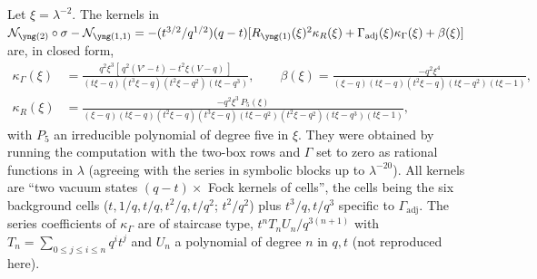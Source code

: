 \begin{result}\label{cr:tower}
Let $\xi = \lambda^{-2}$. The kernels in $\Nfix_{\ytwo}\circ\sigma - \Nfix_{\yoneone} = -(t^{3/2}/q^{1/2})(q-t)[R_{\yone}(\xi)^2\kappa_R(\xi) + \Gamma_{\mathrm{adj}}(\xi)\kappa_\Gamma(\xi) + \beta(\xi)]$ are, in closed form,
\begingroup\small
\begin{align}
\kappa_\Gamma(\xi) &= \frac{q^2\xi^3[\,q^2(V'-t) - t^2\xi(V-q)\,]}{(t\xi-q)(t^3\xi-q)(t^2\xi-q^2)(t\xi-q^3)},\qquad
\beta(\xi) = \frac{-q^2\xi^4}{(\xi-q)(t\xi-q)(t^2\xi-q)(t\xi-q^2)(t\xi-1)},\label{eq:kernels1}\\
\kappa_R(\xi) &= \frac{-q^2\xi^3\,P_5(\xi)}{(\xi-q)(t\xi-q)(t^2\xi-q)(t^3\xi-q)(t\xi-q^2)(t^2\xi-q^2)(t\xi-q^3)(t\xi-1)},\label{eq:kernels2}
\end{align}
\endgroup
with $P_5$ an irreducible polynomial of degree five in $\xi$. They were obtained by running the computation with the two-box rows and $\Gamma$ set to zero as rational functions in $\lambda$ (agreeing with the series in symbolic blocks up to $\lambda^{-20}$). All kernels are ``two vacuum states $(q-t)\times$ Fock kernels of cells'', the cells being the six background cells ($t, 1/q, t/q, t^2/q, t/q^2$; $t^2/q^2$) plus $t^3/q, t/q^3$ specific to $\Gamma_{\mathrm{adj}}$. The series coefficients of $\kappa_\Gamma$ are of staircase type, $t^nT_nU_n/q^{3(n+1)}$ with $T_n = \sum_{0\le j\le i\le n}q^it^j$ and $U_n$ a polynomial of degree $n$ in $q, t$ (not reproduced here).
\end{result}
